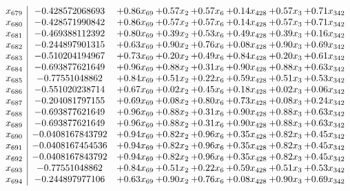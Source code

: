 \documentclass[8pt]{article}
\begin{document}
\[\begin{array}{c| c c@{\hskip 2pt} c@{\hskip 2pt} c@{\hskip 2pt} c@{\hskip 2pt} c@{\hskip 2pt} c@{\hskip 2pt} }
 x_{679}   &  -0.428572068693 & +  0.86 x_{69} & +  0.57 x_{2} & +  0.57 x_{6} & +  0.14 x_{428} & +  0.57 x_{3} & +  0.71 x_{342}\\
 x_{680}   &  -0.428571990842 & +  0.86 x_{69} & +  0.57 x_{2} & +  0.57 x_{6} & +  0.14 x_{428} & +  0.57 x_{3} & +  0.71 x_{342}\\
 x_{681}   &  -0.469388112392 & +  0.80 x_{69} & +  0.39 x_{2} & +  0.53 x_{6} & +  0.49 x_{428} & +  0.39 x_{3} & +  0.16 x_{342}\\
 x_{682}   &  -0.244897901315 & +  0.63 x_{69} & +  0.90 x_{2} & +  0.76 x_{6} & +  0.08 x_{428} & +  0.90 x_{3} & +  0.69 x_{342}\\
 x_{683}   &  -0.510204194967 & +  0.73 x_{69} & +  0.20 x_{2} & +  0.49 x_{6} & +  0.84 x_{428} & +  0.20 x_{3} & +  0.61 x_{342}\\
 x_{684}   &  -0.693877621649 & +  0.96 x_{69} & +  0.88 x_{2} & +  0.31 x_{6} & +  0.90 x_{428} & +  0.88 x_{3} & +  0.63 x_{342}\\
 x_{685}   &  -0.77551048862 & +  0.84 x_{69} & +  0.51 x_{2} & +  0.22 x_{6} & +  0.59 x_{428} & +  0.51 x_{3} & +  0.53 x_{342}\\
 x_{686}   &  -0.551020238714 & +  0.67 x_{69} & +  0.02 x_{2} & +  0.45 x_{6} & +  0.18 x_{428} & +  0.02 x_{3} & +  0.06 x_{342}\\
 x_{687}   &  -0.204081797155 & +  0.69 x_{69} & +  0.08 x_{2} & +  0.80 x_{6} & +  0.73 x_{428} & +  0.08 x_{3} & +  0.24 x_{342}\\
 x_{688}   &  -0.693877621649 & +  0.96 x_{69} & +  0.88 x_{2} & +  0.31 x_{6} & +  0.90 x_{428} & +  0.88 x_{3} & +  0.63 x_{342}\\
 x_{689}   &  -0.693877621649 & +  0.96 x_{69} & +  0.88 x_{2} & +  0.31 x_{6} & +  0.90 x_{428} & +  0.88 x_{3} & +  0.63 x_{342}\\
 x_{690}   &  -0.0408167843792 & +  0.94 x_{69} & +  0.82 x_{2} & +  0.96 x_{6} & +  0.35 x_{428} & +  0.82 x_{3} & +  0.45 x_{342}\\
 x_{691}   &  -0.0408167454536 & +  0.94 x_{69} & +  0.82 x_{2} & +  0.96 x_{6} & +  0.35 x_{428} & +  0.82 x_{3} & +  0.45 x_{342}\\
 x_{692}   &  -0.0408167843792 & +  0.94 x_{69} & +  0.82 x_{2} & +  0.96 x_{6} & +  0.35 x_{428} & +  0.82 x_{3} & +  0.45 x_{342}\\
 x_{693}   &  -0.77551048862 & +  0.84 x_{69} & +  0.51 x_{2} & +  0.22 x_{6} & +  0.59 x_{428} & +  0.51 x_{3} & +  0.53 x_{342}\\
 x_{694}   &  -0.244897977106 & +  0.63 x_{69} & +  0.90 x_{2} & +  0.76 x_{6} & +  0.08 x_{428} & +  0.90 x_{3} & +  0.69 x_{342}\\

\end{array}\]
\end{document}
